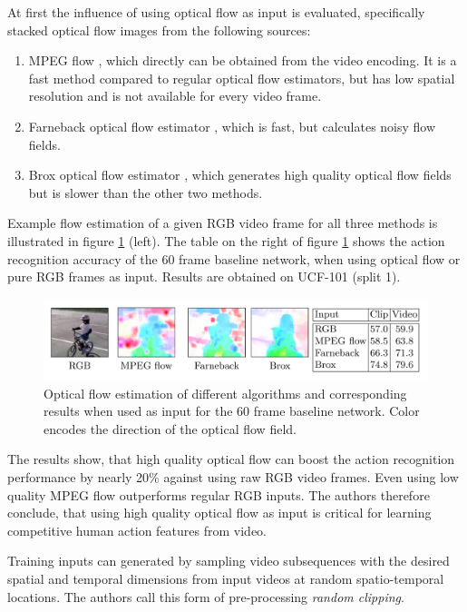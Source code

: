 At first the influence of using optical flow as input is evaluated, specifically stacked optical flow images from the following sources:
\begin{enumerate}
    \item MPEG flow \cite{kantorov_efficient_2014}, which directly can be obtained from the video encoding. It is a fast method compared to regular optical flow estimators, but has low spatial resolution and is not available for every video frame.
    \item Farneback optical flow estimator \cite{farneback_two-frame_2003}, which is fast, but calculates noisy flow fields.
    \item Brox optical flow estimator \cite{brox_high_2004}, which generates high quality optical flow fields but is slower than the other two methods.
\end{enumerate}

Example flow estimation of a given RGB video frame for all three methods is illustrated in figure \ref{fig:longterm_optflow} (left).
The table on the right of figure \ref{fig:longterm_optflow} shows the action recognition accuracy of the 60 frame baseline network, when using optical flow or pure RGB frames as input.
Results are obtained on UCF-101 (split 1).

\begin{figure}[H]
    \centering
    \includegraphics[width=\textwidth]{img_deep/longterm_optflow}
    \caption{Optical flow estimation of different algorithms and corresponding results when used as input for the 60 frame baseline network. Color encodes the direction of the optical flow field. \cite{varol_long-term_2016}}
    \label{fig:longterm_optflow}
\end{figure}

The results show, that high quality optical flow can boost the action recognition performance by nearly 20\% against using raw RGB video frames.
Even using low quality MPEG flow outperforms regular RGB inputs.
The authors therefore conclude, that using high quality optical flow as input is critical for learning competitive human action features from video.

Training inputs can generated by sampling video subsequences with the desired spatial and temporal dimensions from input videos at random spatio-temporal locations.
The authors call this form of pre-processing \textit{random clipping}.

